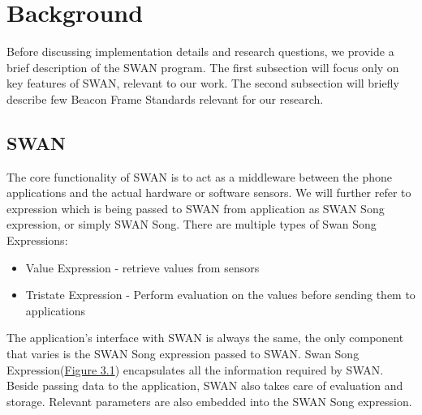 
\chapter{Background} %

\label{Chapter3} %


Before discussing implementation details and research questions, we provide a brief description of the SWAN program.
The first subsection will focus only on key features of SWAN, relevant to our work.
The second subsection will briefly describe few Beacon Frame Standards relevant for our research.

\section{SWAN}
The core functionality of SWAN is to act as a middleware between the phone applications and the actual hardware or software sensors.
We will further refer to expression which is being passed to SWAN from application as SWAN Song expression, or simply SWAN Song.
There are multiple types of Swan Song Expressions: \label{swan_song_expressions}
\begin{itemize}
 \item Value Expression - retrieve values from sensors
 \item Tristate Expression - Perform evaluation on the values before sending them to applications
\end{itemize}

The application's interface with SWAN is always the same, the only component that varies is the SWAN Song expression passed to SWAN.
Swan Song Expression(\hyperref[fig:SwanExpression]{Figure 3.1}) encapsulates all the information required by SWAN.
Beside passing data to the application, SWAN also takes care of evaluation and storage. Relevant parameters are also embedded into the 
SWAN Song expression.

